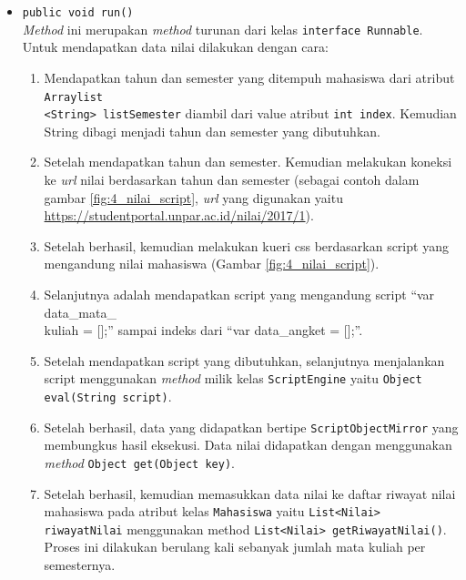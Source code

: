 \begin{enumerate}
\begin{itemize}
		\item \texttt{public void run()}\\
    	 \textit{Method} ini merupakan \textit{method} turunan dari kelas \texttt{interface Runnable}. Untuk mendapatkan data nilai dilakukan dengan cara:
    	\begin{enumerate}
    		\item Mendapatkan tahun dan semester yang ditempuh mahasiswa dari atribut \texttt{Arraylist\\<String> listSemester} diambil dari value atribut \texttt{int index}. Kemudian String dibagi menjadi tahun dan semester yang dibutuhkan.
    		\item Setelah mendapatkan tahun dan semester. Kemudian melakukan koneksi ke \textit{url} nilai berdasarkan tahun dan semester (sebagai contoh dalam gambar \ref{fig:4_nilai_script}, \textit{url} yang digunakan yaitu \url{https://studentportal.unpar.ac.id/nilai/2017/1}).
    		\item Setelah berhasil, kemudian melakukan kueri css berdasarkan script yang mengandung nilai mahasiswa (Gambar \ref{fig:4_nilai_script}). 
    		\item Selanjutnya adalah mendapatkan script yang mengandung script ``var data\_mata\_\\kuliah = [];'' sampai indeks dari ``var data\_angket = [];''.
    		\item Setelah mendapatkan script yang dibutuhkan, selanjutnya menjalankan script menggunakan \textit{method} milik kelas \texttt{ScriptEngine} yaitu \texttt{Object eval(String script)}.
    		\item Setelah berhasil, data yang didapatkan bertipe \texttt{ScriptObjectMirror} yang membungkus hasil eksekusi. Data nilai didapatkan dengan menggunakan \textit{method} \texttt{Object get(Object key)}.
    		\item Setelah berhasil, kemudian memasukkan data nilai ke daftar riwayat nilai mahasiswa pada atribut kelas \texttt{Mahasiswa} yaitu \texttt{List<Nilai> riwayatNilai} menggunakan method \texttt{List<Nilai> getRiwayatNilai()}. Proses ini dilakukan berulang kali sebanyak jumlah mata kuliah per semesternya.
    	\end{enumerate}
    	

\end{itemize}
\end{enumerate}
